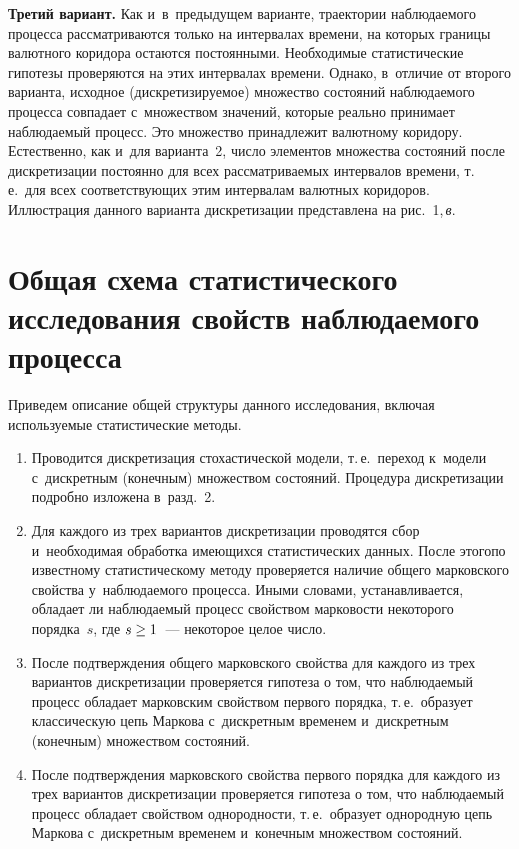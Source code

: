 \begin{multicols}{2}
\smallskip

  
  \textbf{Третий вариант.} Как и~в~предыдущем варианте, траектории 
наблюдаемого процесса рассматриваются только на интервалах времени, на 
которых границы валютного коридора остаются постоянными. Необходимые 
статистические гипотезы проверяются на этих интервалах времени. Однако, 
в~отличие от второго варианта, исходное (дискретизируемое) множество 
состояний наблюдаемого процесса совпадает с~множеством значений, которые 
реально принимает наблюдаемый процесс. Это множество принадлежит 
валютному коридору. Естественно, как и~для варианта~2, число элементов 
множества состояний после дискретизации постоянно для всех 
рассматриваемых интервалов времени, т.\,е.\ для всех соответствующих этим 
интервалам валютных коридоров. Иллюстрация данного варианта 
дискретизации представлена на рис.~1,\,\textit{в}. 


\section{Общая схема статистического исследования свойств 
наблюдаемого процесса}

  Приведем описание общей структуры данного исследования, включая 
используемые статистические методы.
  \begin{enumerate}[1.]
  \item Проводится дискретизация стохастической модели, т.\,е.\ переход 
  к~модели с~дискретным (конечным) множеством состояний. Процедура 
дискретизации подробно изложена в~разд.~2.
  \item Для каждого из трех вариантов дискретизации проводятся сбор 
и~необходимая обработка имеющихся статистических данных. После этого\linebreak по 
известному статистическому методу проверяется наличие общего марковского 
свойства у~наблюдаемого процесса. Иными словами, уста\-нав\-ли\-ва\-ет\-ся, 
обладает ли наблюдаемый процесс свойством марковости некоторого 
порядка~$s$, где $s\hm\geq 1$~--- некоторое целое число.
  \item После подтверждения общего марковского свойства для каждого из 
трех вариантов дискретизации проверяется гипотеза о том, что наблюдаемый 
процесс обладает марковским \mbox{свойством} первого порядка, т.\,е.\ образует 
классическую цепь Маркова с~дискретным временем и~дискретным (конечным) 
множеством состояний. 
  \item После подтверждения марковского свойства первого порядка для 
каждого из трех вариантов дискретизации проверяется гипотеза о том, что 
наблюдаемый процесс обладает свойством однородности, т.\,е.\ образует 
однородную цепь Маркова с~дискретным временем и~конечным множеством 
состояний.
  \end{enumerate}
  

\end{multicols}
